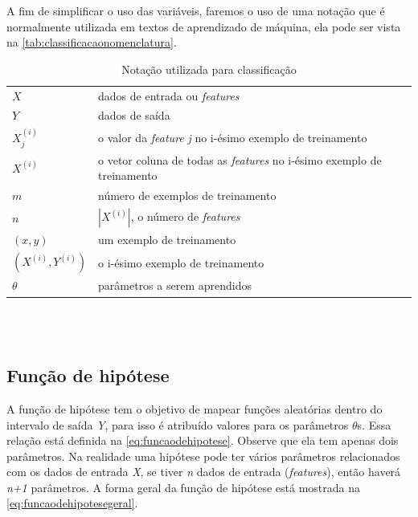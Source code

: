 A fim de simplificar o uso das variáveis, faremos o uso de uma notação que é normalmente utilizada em textos de aprendizado de máquina, ela pode ser vista na \autoref{tab:classificacaonomenclatura}.

\begin{table}[!htb]
\caption{Notação utilizada para classificação} \label{tab:classificacaonomenclatura}
\begin{center}
\begin{tabular}{ll}
  \toprule
  $X$ & dados de entrada ou \textit{features} \\
  $Y$ & dados de saída \\
  $X_j^{(i)}$ & o valor da \textit{feature} \textit{j} no i-ésimo exemplo de treinamento \\
  $X^{(i)}$ & o vetor coluna de todas as \textit{features} no i-ésimo exemplo de treinamento \\
  $m$ & número de exemplos de treinamento \\
  $n$ & $|X^{(i)}|$, o número de \textit{features} \\
  $(x, y)$ & um exemplo de treinamento \\
  $(X^{(i)}, Y^{(i)})$ & o i-ésimo exemplo de treinamento \\
  $\theta$ & parâmetros a serem aprendidos \\
  \bottomrule
\end{tabular}
\end{center}

\end{table}



\ \\
\ \\

\subsection{Função de hipótese}

A função de hipótese tem o objetivo de mapear funções aleatórias dentro do intervalo de saída \textit{Y}, para isso é atribuído valores para os parâmetros $\theta$s. Essa relação está definida na \autoref{eq:funcaodehipotese}. Observe que ela tem apenas dois parâmetros. Na realidade uma hipótese pode ter vários parâmetros relacionados com os dados de entrada \textit{X}, se tiver \textit{n} dados de entrada (\textit{features}), então haverá \textit{n+1} parâmetros. A forma geral da função de hipótese está mostrada na \autoref{eq:funcaodehipotesegeral}.

